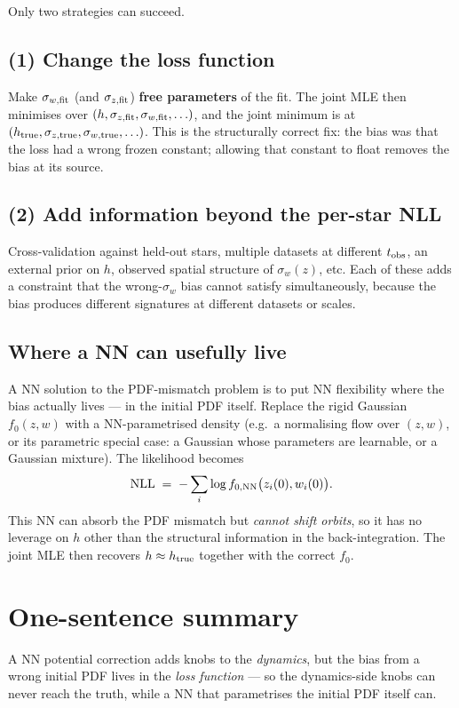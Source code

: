 \documentclass[11pt]{article}
\begin{document}
Only two strategies can succeed.

\subsection*{(1) Change the loss function}

Make $\sigma_{w,\rm fit}$ (and $\sigma_{z,\rm fit}$) \textbf{free parameters}
of the fit.  The joint MLE then minimises over
$(h, \sigma_{z,\rm fit}, \sigma_{w,\rm fit}, \ldots)$, and the joint minimum
is at $(h_{\rm true}, \sigma_{z,\rm true}, \sigma_{w,\rm true}, \ldots)$.  This
is the structurally correct fix: the bias was that the loss had a wrong frozen
constant; allowing that constant to float removes the bias at its source.

\subsection*{(2) Add information beyond the per-star NLL}

Cross-validation against held-out stars, multiple datasets at different
$t_{\rm obs}$, an external prior on $h$, observed spatial structure of
$\sigma_w(z)$, etc.  Each of these adds a constraint that the wrong-$\sigma_w$
bias cannot satisfy simultaneously, because the bias produces different
signatures at different datasets or scales.

\subsection*{Where a NN can usefully live}

A NN solution to the PDF-mismatch problem is to put NN flexibility where the
bias actually lives --- in the initial PDF itself.  Replace the rigid Gaussian
$f_0(z, w)$ with a NN-parametrised density (e.g.\ a normalising flow over
$(z, w)$, or its parametric special case: a Gaussian whose parameters are
learnable, or a Gaussian mixture).  The likelihood becomes
\begin{equation}
  \mathrm{NLL} \;=\; -\sum_i \log f_{0,\rm NN}\bigl(z_i(0), w_i(0)\bigr).
\end{equation}
This NN can absorb the PDF mismatch but \emph{cannot shift orbits}, so it has
no leverage on $h$ other than the structural information in the
back-integration.  The joint MLE then recovers $h \approx h_{\rm true}$
together with the correct $f_0$.

\section*{One-sentence summary}

A NN potential correction adds knobs to the \emph{dynamics}, but the bias from
a wrong initial PDF lives in the \emph{loss function} --- so the dynamics-side
knobs can never reach the truth, while a NN that parametrises the initial PDF
itself can.
\end{document}

